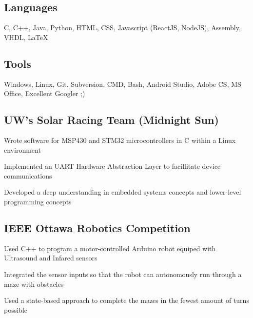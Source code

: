 \documentclass[10pt, letterpaper]{myCV}
\begin{document}
\makeheader

\subsection{Languages}
C, C++, Java, Python, HTML, CSS, Javascript (ReactJS, NodeJS), Assembly, VHDL, \LaTeX{}

\subsection{Tools}
Windows, Linux, Git, Subversion, CMD, Bash, Android Studio, Adobe CS, MS Office, Excellent Googler ;)


\subsection{UW's Solar Racing Team (Midnight Sun)}
\begin{desc}
    \item Wrote software for MSP430 and STM32 microcontrollers in C within a Linux environment
    \item Implemented an UART Hardware Abstraction Layer to facillitate device communications
    \item Developed a deep understanding in embedded systems concepts and lower-level programming concepts
\end{desc}
\subsection{IEEE Ottawa Robotics Competition}
\begin{desc}
    \item Used C++ to program a motor-controlled Arduino robot equiped with Ultrasound and Infared sensors
    \item Integrated the sensor inputs so that the robot can autonomously run through a maze with obstacles
    \item Used a state-based approach to complete the mazes in the fewest amount of turns possible
\end{desc}
\end{document}
